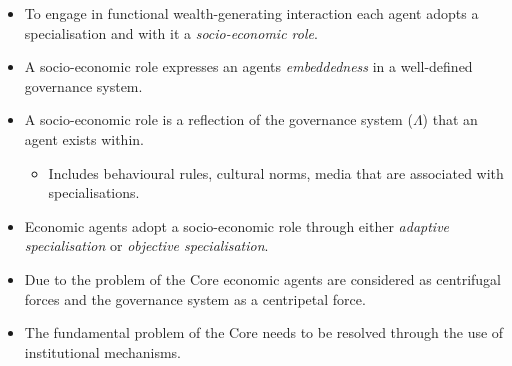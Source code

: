 \documentclass[10pt]{beamer}
\begin{document}
\begin{frame}
\begin{itemize}
\item To engage in functional wealth-generating interaction each agent adopts a specialisation and with it a \emph{socio-economic role}.
\medskip
\item A socio-economic role expresses an agents \emph{embeddedness} in a well-defined governance system.
\medskip
\begin{figure}[h]
\begin{center}
\end{center}
\end{figure}
\medskip
\item A socio-economic role is a reflection of the governance system ($\Lambda$) that an agent exists within.
\begin{itemize}
\medskip
\item Includes behavioural rules, cultural norms, media that are associated with specialisations.
\end{itemize}
\medskip
\item Economic agents adopt a socio-economic role through either \emph{adaptive specialisation} or \emph{objective specialisation}.
\end{itemize}
\end{frame}

\begin{frame} %
\begin{figure}[h]
\begin{center}
\end{center}
\end{figure}
\begin{itemize}
\item Due to the problem of the Core economic agents are considered as centrifugal forces and the governance system as a centripetal force.
\medskip
\item The fundamental problem of the Core needs to be resolved through the use of institutional mechanisms.
\end{itemize}
\end{frame}
\end{document}
